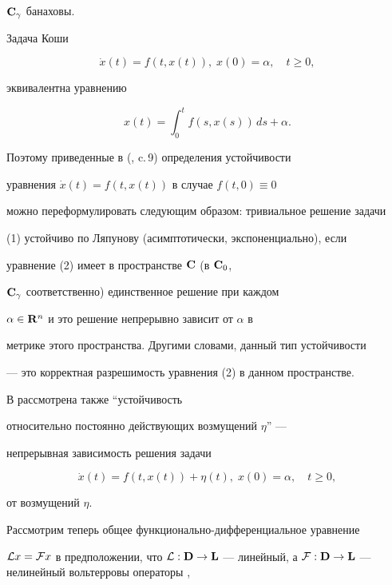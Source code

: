 ${\bold {C}}_\gamma$ банаховы.





Задача Коши


\begin{equation}


\Dot x(t)=f(t,x(t)),\;x(0)=\alpha,\quad t\ge 0,


\end{equation}


эквивалентна уравнению


\begin{equation}


x(t)=\int_0^tf(s,x(s))\,ds+\alpha.


\end{equation}


Поэтому приведенные в (\cite{10}, c.\,9) определения устойчивости


уравнения $\Dot x(t)=f(t,x(t))$ в случае $f(t,0)\equiv 0$


можно переформулировать следующим образом: тривиальное решение задачи


(1) устойчиво по Ляпунову (асимптотически, экспоненциально), если


уравнение (2) имеет в пространстве ${\bold {C}}$ (в ${\bold {C}}_0$,


${\bold {C}}_\gamma$ соответственно) единственное решение при каждом


$\alpha\in{\bold {R}}^n$ и это решение непрерывно зависит от $\alpha$ в


метрике этого пространства. Другими словами, данный тип устойчивости


--- это корректная разрешимость уравнения (2) в данном пространстве.


В \cite{10} рассмотрена также ``устойчивость


относительно постоянно действующих возмущений $\eta$'' ---


непрерывная зависимость решения задачи


$$


\Dot x(t)=f(t,x(t))+\eta(t),\;x(0)=\alpha,\quad t\ge 0,


$$


от возмущений $\eta$.





Рассмотрим теперь общее функционально-дифференциальное уравнение


${\cal L}x={\cal F}x$ в предположении, что ${\cal


L}:{\spc{D}}\to\spc{L}$ --- линейный, а ${\cal


F}:{\spc{D}}\to\spc{L}$ --- нелинейный вольтерровы операторы \cite{3},


